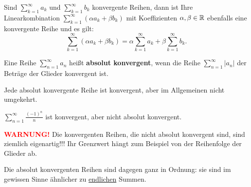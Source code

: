 \begin{thm} 
	Sind $\sum_{k=1}^\infty a_k$ und $\sum_{k=1}^\infty b_k$ konvergente Reihen, dann ist Ihre Linearkombination $\sum_{k=1}^\infty (\alpha a_k + \beta b_k)$ mit Koeffizienten $\alpha, \beta \in \mathbb{R}$ ebenfalls eine konvergente Reihe und es gilt: 
	\[
		\sum_{k=1}^\infty (\alpha a_k + \beta b_k) = \alpha \sum_{k=1}^ \infty a_k + \beta \sum_{k=1}^\infty b_k. 
	\]
\end{thm} 

\begin{defn}
	Eine Reihe $\sum_{n=1}^\infty a_n$ heißt \textbf{absolut konvergent}, wenn die Reihe $\sum_{n=1}^\infty |a_n|$ der Beträge der Glieder konvergent ist. 
\end{defn} 

\begin{thm}
	Jede absolut konvergente Reihe ist konvergent, aber im Allgemeinen nicht umgekehrt. 
\end{thm} 

\begin{bsp}
	$\sum_{n=1}^\infty \frac{(-1)^n}{n}$ ist konvergent, aber nicht absolut konvergent. 
\end{bsp} 


\begin{bem}
	\textcolor{red}{\textbf{WARNUNG!}} 
	Die konvergenten Reihen, die nicht absolut konvergent sind, sind ziemlich eigenartig!!! Ihr Grenzwert hängt zum Beispiel von der Reihenfolge der Glieder ab.
	
	Die absolut konvergenten Reihen sind dagegen ganz in Ordnung: sie sind im gewissen Sinne ähnlicher zu \underline{endlichen} Summen. 
\end{bem} 

